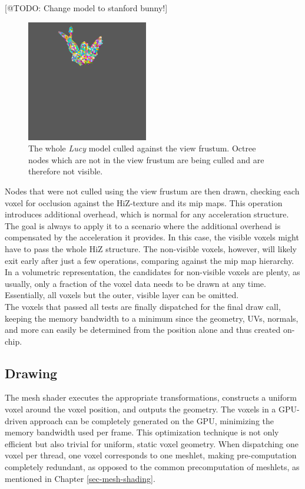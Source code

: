 [@TODO: Change model to stanford bunny!]
\begin{figure}[h]
    \centering
    \includegraphics[width=200px]{images/graphics/lucy-frustum-culling.jpg}
    \caption{The whole \emph{Lucy} model culled against the view frustum. Octree nodes which are not in the 
    view frustum are being culled and are therefore not visible.}
    \label{fig:lucy-frustum-culling}
\end{figure}

Nodes that were not culled using the view frustum are then drawn, checking each voxel for occlusion against the 
\ac{HiZ}-texture and its mip maps. This operation introduces additional overhead, which is normal for any acceleration structure. 
The goal is always to apply it to a scenario where the additional overhead is compensated by the acceleration it provides. 
In this case, the visible voxels might have to pass the whole \ac{HiZ} structure. The non-visible voxels, however, will likely 
exit early after just a few operations, comparing against the mip map hierarchy. In a volumetric representation, the candidates 
for non-visible voxels are plenty, as usually, only a fraction of the voxel data needs to be drawn at any time. Essentially, 
all voxels but the outer, visible layer can be omitted. \\

\noindent
The voxels that passed all tests are finally dispatched for the final draw call, keeping the memory bandwidth to a minimum 
since the geometry, UVs, normals, and more can easily be determined from the position alone and thus created on-chip. \\


\subsection*{Drawing} \label{subsec-mesh-shader}

The mesh shader executes the appropriate transformations, constructs a uniform voxel around the voxel position, 
and outputs the geometry. The voxels in a \ac{GPU}-driven approach can be completely generated on the \ac{GPU}, 
minimizing the memory bandwidth used per frame. This optimization technique is not only efficient but also 
trivial for uniform, static voxel geometry. When dispatching one voxel per thread, one voxel corresponds 
to one meshlet, making pre-computation completely redundant, as opposed to the common precomputation of meshlets, 
as mentioned in Chapter \ref{sec-mesh-shading}.


